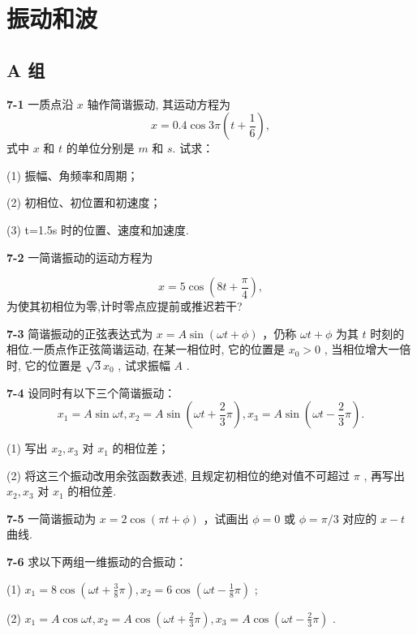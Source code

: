 \chapter{振动和波}

\section*{A 组}
\vspace{0.3cm}

\textbf{7-1} 一质点沿 $x$ 轴作简谐振动, 其运动方程为
\[
x = 0. 4 \cos 3 \pi \left(t + \frac {1}{6}\right),
\]
式中 $x$ 和 $t$ 的单位分别是 $m$ 和 $s$. 试求：

(1) 振幅、角频率和周期；

(2) 初相位、初位置和初速度；

(3) t=1.5s 时的位置、速度和加速度.

\newpage

\textbf{7-2} 一简谐振动的运动方程为

\[
x = 5 \cos \left(8 t + \frac {\pi}{4}\right),
\]
为使其初相位为零,计时零点应提前或推迟若干?

\newpage

\textbf{7-3} 简谐振动的正弦表达式为 $x = A \sin(\omega t + \phi)$ ，仍称 $\omega t + \phi$ 为其 $t$ 时刻的相位.一质点作正弦简谐运动, 在某一相位时, 它的位置是 $x_0 > 0$ , 当相位增大一倍时, 它的位置是 $\sqrt{3} x_0$ , 试求振幅 $A$ .

\newpage

\textbf{7-4} 设同时有以下三个简谐振动：
\[
x _ {1} = A \sin \omega t,x _ {2} = A \sin \left(\omega t + \frac {2}{3} \pi\right),x _ {3} = A \sin \left(\omega t - \frac {2}{3} \pi\right).
\]

(1) 写出 $x_{2}, x_{3}$ 对 $x_{1}$ 的相位差；

(2) 将这三个振动改用余弦函数表述, 且规定初相位的绝对值不可超过 $\pi$ , 再写出 $x_{2}, x_{3}$ 对 $x_{1}$ 的相位差.

\newpage

\textbf{7-5} 一简谐振动为 $x = 2\cos (\pi t + \phi)$ ，试画出 $\phi = 0$ 或 $\phi = \pi /3$ 对应的 $x - t$ 曲线.

\newpage

\textbf{7-6} 求以下两组一维振动的合振动：

(1) $x_{1} = 8\cos \left(\omega t + \frac{3}{8}\pi\right), x_{2} = 6\cos \left(\omega t - \frac{1}{8}\pi\right)$ ;

(2) $x_{1} = A\cos \omega t, x_{2} = A\cos \left(\omega t + \frac{2}{3}\pi\right), x_{3} = A\cos \left(\omega t - \frac{2}{3}\pi\right)$ .

